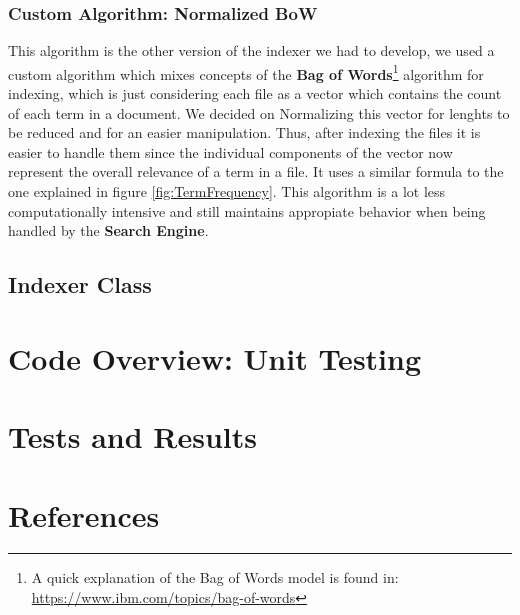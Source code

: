 \documentclass{article}
\begin{document}
\subsubsection{Custom Algorithm: Normalized BoW} 
This algorithm is the other version of the indexer we had to develop, we used a custom algorithm which mixes concepts of the \textbf{Bag of Words}\footnote{A quick explanation of the Bag of Words model is found in: \url{https://www.ibm.com/topics/bag-of-words}} algorithm for indexing, which is just considering each file as a vector which contains the count of each term in a document. We decided on  Normalizing this vector for lenghts to be reduced and for an easier manipulation. Thus, after indexing the files it is easier to handle them since the individual components of the vector now represent the overall relevance of a term in a file. It uses a similar formula to the one explained in figure \ref*{fig:TermFrequency}. This algorithm is a lot less computationally intensive and still maintains appropiate behavior when being handled by the \textbf{Search Engine}.
\subsection{Indexer Class}

\section{Code Overview: Unit Testing}

\section{Tests and Results}

\section{References}
\end{document}
